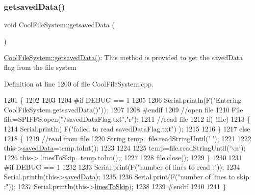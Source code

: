 \subsubsection{\texorpdfstring{getsaved\+Data()}{getsavedData()}}
{\footnotesize\ttfamily void Cool\+File\+System\+::getsaved\+Data (\begin{DoxyParamCaption}{ }\end{DoxyParamCaption})}

\hyperlink{class_cool_file_system_a70701d05e811604af1b531f4f6dc69ed}{Cool\+File\+System\+::getsaved\+Data()}\+: This method is provided to get the saved\+Data flag from the file system 

Definition at line 1200 of file Cool\+File\+System.\+cpp.


\begin{DoxyCode}
1201 \{
1202 
1203 
1204 \textcolor{preprocessor}{#if DEBUG == 1}
1205     
1206     Serial.println(F(\textcolor{stringliteral}{"Entering CoolFileSystem.getsavedData()"}));    
1207     
1208 \textcolor{preprocessor}{#endif}
1209     \textcolor{comment}{//open file}
1210     File file=SPIFFS.open(\textcolor{stringliteral}{"/savedDataFlag.txt"},\textcolor{stringliteral}{"r"});    
1211     \textcolor{comment}{//read file}
1212     \textcolor{keywordflow}{if}( !file)  
1213     \{
1214         Serial.println( F(\textcolor{stringliteral}{"failed to read savedDataFlag.txt"}) );
1215         
1216     \}
1217     \textcolor{keywordflow}{else}
1218     \{       
1219         \textcolor{comment}{//read from file    }
1220         String \hyperlink{_irene3000_8h_a5905d48604152cf57aa6bfa087b49173}{temp}=file.readStringUntil(\textcolor{charliteral}{' '});
1221         
1222         this->\hyperlink{class_cool_file_system_ad9f5b739a32100f5f21270c3d9ee2b1d}{savedData}=temp.toInt();
1223 
1224         
1225         temp=file.readStringUntil(\textcolor{charliteral}{'\(\backslash\)n'});
1226         this-> \hyperlink{class_cool_file_system_a84fdb6057e534b395512463daa28ea3c}{linesToSkip}=temp.toInt();;    
1227         
1228         file.close();   
1229     \}
1230     
1231 \textcolor{preprocessor}{#if DEBUG == 1}
1232 
1233     Serial.print(F(\textcolor{stringliteral}{"number of lines to read :"}));
1234     Serial.println(this->\hyperlink{class_cool_file_system_ad9f5b739a32100f5f21270c3d9ee2b1d}{savedData});
1235     
1236     Serial.print(F(\textcolor{stringliteral}{"number of lines to skip :"}));
1237     Serial.println(this->\hyperlink{class_cool_file_system_a84fdb6057e534b395512463daa28ea3c}{linesToSkip});
1238 
1239 \textcolor{preprocessor}{#endif}
1240     
1241 \}
\end{DoxyCode}
